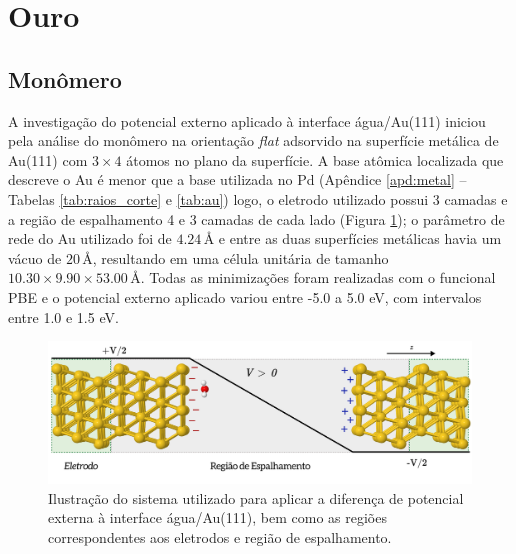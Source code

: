 \section{Ouro\label{sec:au_negf}}

\subsection{Monômero \label{sec:neq_au_mon}}
A investigação do potencial externo aplicado à interface água/Au(111) iniciou pela análise do monômero na orientação \textit{flat} adsorvido na superfície metálica de Au(111) com $ 3\times4 $ átomos no plano da superfície. A base atômica localizada que descreve o Au é menor que a base utilizada no Pd (Apêndice \ref{apd:metal} -- Tabelas \ref{tab:raios_corte} e \ref{tab:au}) logo, o eletrodo utilizado possui 3 camadas e a região de espalhamento 4 e 3 camadas de cada lado (Figura \ref{fig:sistema_au}); o parâmetro de rede do Au utilizado foi de $ 4.24\,\si{\angstrom} $ e entre as duas superfícies metálicas havia um vácuo de $ 20\,\si{\angstrom} $, resultando em uma célula unitária de tamanho $ 10.30\times9.90\times53.00\,\si{\angstrom} $. Todas as minimizações foram realizadas com o funcional PBE e o potencial externo aplicado variou entre -5.0 a 5.0 eV, com intervalos entre 1.0 e 1.5 eV. %
\begin{figure}[h!]
	\centering
	\caption{Ilustração do sistema utilizado para aplicar a diferença de potencial externa à interface água/Au(111), bem como as regiões correspondentes aos eletrodos e região de espalhamento.}
	\label{fig:sistema_au}
	\includegraphics[scale=0.35]{figs/sistema_negf.png}
\end{figure}

